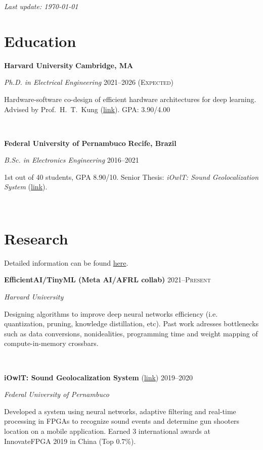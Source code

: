 \documentclass[letterpaper,10pt]{article}
\newcommand{\entry}[4]{

\begin{minipage}[t]{.15\textwidth}
\end{minipage}
\hfill\vline\hfill 
\begin{minipage}[t]{0.95\textwidth}
#2 \hfill \textsc{#1}

\textit{#3}

\footnotesize{#4}
\end{minipage}\\\vspace{.25cm}}
\newcommand{\we}[5]{

\begin{minipage}[t]{.15\textwidth}
\end{minipage}
\hfill\vline\hfill 
\begin{minipage}[t]{0.95\textwidth}
#2 \hfill \textbf{#5}

\textit{#3} \hfill \textsc{#1}

\footnotesize{#4}
\end{minipage}\\\vspace{.25cm}}
\newcommand{\harv}{Harvard University}
\newcommand{\ufpe}{Federal University of Pernambuco}
\begin{document}
\par{\par}
\par{\par}
\par{\par}
\hfill \textit{Last update: \today}
\vspace{-.25cm}

\section{Education}
\vspace*{.1cm}
\we{2021--2026 (Expected)}{\textbf{\harv}}{Ph.D. in Electrical Engineering}{Hardware-software co-design of efficient hardware architectures for deep learning. Advised by Prof.\ H.\ T.\ Kung (\href{https://www.eecs.harvard.edu/htk/}{link}). GPA: 3.90/4.00}{Cambridge, MA}

\we{2016--2021}{\textbf{\ufpe}}{B.Sc. in Electronics Engineering}{
	1st out of 40 students, GPA 8.90/10. Senior Thesis: \textit{iOwlT: Sound Geolocalization System} (\href{https://www.matheussfarias.com/assets/files/SeniorThesis.pdf}{link}).
	}{Recife, Brazil}

\vspace*{-.25cm}
\section{Research}

Detailed information can be found \href{https://www.matheussfarias.com/}{here}.

\vspace{.1cm}

\entry{2021--Present}{\textbf{EfficientAI/TinyML (Meta AI/AFRL collab)}}{\harv}{
	Designing algorithms to improve deep neural networks efficiency (i.e. quantization, pruning, knowledge distillation, etc). Past work adresses bottlenecks such as data conversions, nonidealities, programming time and weight mapping of compute-in-memory crossbars.
}

\entry{2019--2020}{\textbf{iOwlT: Sound Geolocalization System} (\href{https://www.matheussfarias.com/iowlt.html}{link})}{\ufpe}{
	Developed a system using neural networks, adaptive filtering and real-time processing in FPGAs to recognize sound events and determine gun shooters location on a mobile application. Earned 3 international awards at InnovateFPGA 2019 in China (Top 0.7\%).
}
\end{document}
